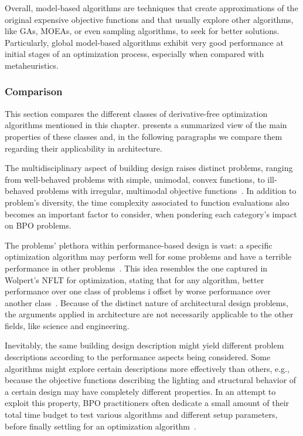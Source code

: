 	Overall, model-based algorithms are techniques that create approximations of the original expensive objective functions and that usually explore other algorithms, like \acp{GA}, \acp{MOEA}, or even sampling algorithms, to seek for better solutions. Particularly, global model-based algorithms exhibit very good performance at initial stages of an optimization process, especially when compared with metaheuristics. %
	
	\subsubsection{Comparison}
	\label{ssec:comparisondfo}
	
	This section compares the different classes of derivative-free optimization algorithms mentioned in this chapter.  presents a summarized view of the main properties of these classes and, in the following paragraphs we compare them regarding their applicability in architecture. 

	The multidisciplinary aspect of building design raises distinct problems, ranging from well-behaved problems with simple, unimodal, convex functions, to ill-behaved problems with irregular, multimodal objective functions~\cite{Wortmann2017ADO}. In addition to problem's diversity, the time complexity associated to function evaluations also becomes an important factor to consider, when pondering each category's impact on \ac{BPO} problems.
	
	The problems' plethora within performance-based design is vast: a specific optimization algorithm may perform well for some problems and have a terrible performance in other problems~\cite{Wortmann2017GABESTCHOICE, Fang2017}. This idea resembles the one captured in Wolpert's \ac{NFLT} for optimization, stating that for any algorithm, better
	performance over one class of problems i offset by worse performance over another class~\cite{Wolpert1997NFLT}. Because of the distinct nature of architectural design problems, the arguments applied in architecture are not necessarily applicable to the other fields, like science and engineering. 
	
	Inevitably, the same building design description might yield different problem descriptions according to the performance aspects being considered. Some algorithms might explore certain descriptions more effectively than others, e.g., because the objective functions describing the lighting and structural behavior of a certain design may have completely different properties. In an attempt to exploit this property, \ac{BPO} practitioners often dedicate a small amount of their total time budget to test various algorithms and different setup parameters, before finally settling for an optimization algorithm~\cite{Hamdy2016}.	
	

